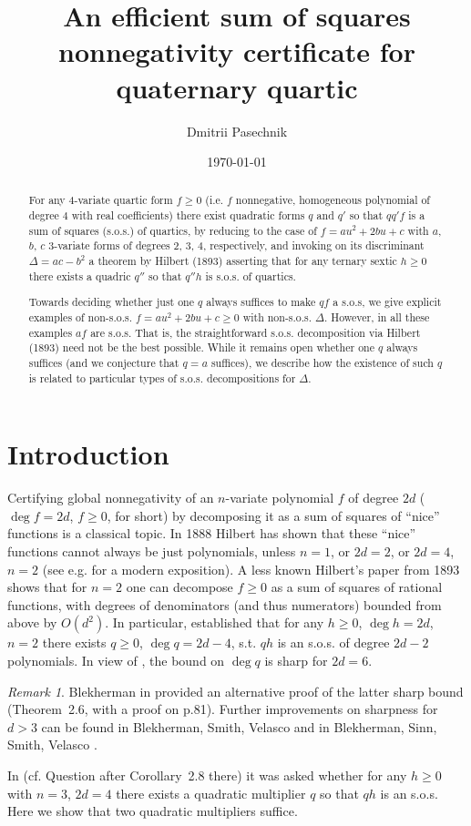 \documentclass[a4paper,twoside,reqno]{amsart}
\date{\today}
\title[Efficient sum of squares certificate for 4-ary 4-ic]
{An efficient sum of squares nonnegativity certificate for quaternary quartic}
\author{Dmitrii Pasechnik}
\theoremstyle{plain}
\theoremstyle{definition}
\theoremstyle{remark}
\newtheorem{rem}[prop]{Remark}
\begin{document}
\begin{abstract}
For any 4-variate quartic form $f\geq 0$ (i.e. $f$ nonnegative, homogeneous polynomial of degree $4$
with real coefficients) there exist 
quadratic forms $q$ and $q'$ so that $qq'f$ is a sum of squares (s.o.s.) of quartics,
by reducing to the case of $f=au^2+2bu+c$  with $a$, $b$, $c$ $3$-variate forms of degrees 2, 3, 4, respectively,
and invoking  on its discriminant $\Delta=ac-b^2$ a theorem by Hilbert (1893) asserting that for any ternary sextic
$h\geq 0$ there exists a quadric $q''$ so that $q''h$ is s.o.s. of quartics.

Towards deciding whether
just one $q$ always suffices to make $qf$ a s.o.s, we give explicit examples of non-s.o.s.
$f=au^2+2bu+c\geq 0$ with non-s.o.s. $\Delta$. However, in all these examples $af$ are s.o.s. That is, the straightforward s.o.s. decomposition via Hilbert (1893) need not be the best possible.
While it remains open whether one $q$ always suffices (and we conjecture that $q=a$ suffices), we describe how
the existence of such $q$ is related to particular
types of s.o.s. decompositions for $\Delta$. 
\end{abstract}

\maketitle

\section{Introduction}
Certifying global nonnegativity of an $n$-variate polynomial $f$ of degree $2d$ 
($\deg{f}=2d$, $f\geq 0$, for short) by
decomposing it as a sum of squares of ``nice'' functions is a classical topic.
In 1888 Hilbert \cite{Hilb-deg4} has shown that these ``nice'' functions cannot always be
just polynomials, unless $n=1$, or $2d=2$, or $2d=4$, $n=2$ (see e.g. \cite{MR2500469} for a modern
exposition).
A less known Hilbert's paper \cite{Hilb-ternsos} from 1893 shows that for $n=2$ one can decompose $f\geq 0$ as
a sum of squares of rational functions, with degrees of denominators (and thus numerators)
bounded from above by $O(d^2)$.
In particular, \cite{Hilb-ternsos} established that for any $h\geq 0$, $\deg{h}=2d$, $n=2$ there exists $q\geq 0$, $\deg{q}=2d-4$, s.t. $qh$ is an s.o.s. of degree $2d-2$ polynomials. In view of \cite{Hilb-deg4}, 
the bound on $\deg{q}$ is sharp for $2d=6$.

\begin{rem}
Blekherman in \cite{MR3272733} provided an alternative proof of the latter sharp bound (Theorem~2.6, with a proof on p.81).
Further improvements on sharpness for $d>3$ can be found in Blekherman, Smith, Velasco \cite{MR3998790} and in
Blekherman, Sinn, Smith, Velasco \cite{blekherman2024}.

In \cite{MR3272733} (cf. Question after Corollary~2.8 there) it was asked whether for any $h\geq 0$ with $n=3$, $2d=4$ there exists a quadratic multiplier $q$ so that $qh$ is an s.o.s.
Here we show that two quadratic multipliers suffice.
\end{rem}
\end{document}
